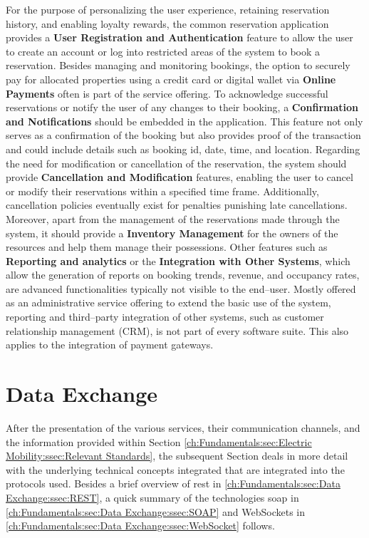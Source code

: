 For the purpose of personalizing the user experience, retaining reservation history, and enabling loyalty rewards, the common reservation application provides a \textbf{User Registration and Authentication} feature to allow the user to create an account or log into restricted areas of the system to book a reservation.
Besides managing and monitoring bookings, the option to securely pay for allocated properties using a credit card or digital wallet via \textbf{Online Payments} often is part of the service offering.
To acknowledge successful reservations or notify the user of any changes to their booking, a \textbf{Confirmation and Notifications} should be embedded in the application. This feature not only serves as a confirmation of the booking but also provides proof of the transaction and could include details such as booking \acrshort{id}, date, time, and location.
Regarding the need for modification or cancellation of the reservation, the system should provide \textbf{Cancellation and Modification} features, enabling the user to cancel or modify their reservations within a specified time frame. Additionally, cancellation policies eventually exist for penalties punishing late cancellations.
Moreover, apart from the management of the reservations made through the system, it should provide a \textbf{Inventory Management} for the owners of the resources and help them manage their possessions.
Other features such as \textbf{Reporting and analytics} or the \textbf{Integration with Other Systems}, which allow the generation of reports on booking trends, revenue, and occupancy rates, are advanced functionalities typically not visible to the end--user. Mostly offered as an administrative service offering to extend the basic use of the system, reporting and third--party integration of other systems, such as customer relationship management (CRM), is not part of every software suite. 
This also applies to the integration of payment gateways.

\section{Data Exchange}
\label{ch:Fundamentals:sec:Data Exchange}

After the presentation of the various services, their communication channels, and the information provided within Section \ref{ch:Fundamentals:sec:Electric Mobility:ssec:Relevant Standards}, the subsequent Section deals in more detail with the underlying technical concepts integrated that are integrated into the protocols used.
Besides a brief overview of \acrfull{rest} in \ref{ch:Fundamentals:sec:Data Exchange:ssec:REST}, a quick summary of the technologies \acrfull{soap} in \ref{ch:Fundamentals:sec:Data Exchange:ssec:SOAP} and WebSockets in \ref{ch:Fundamentals:sec:Data Exchange:ssec:WebSocket} follows. 

